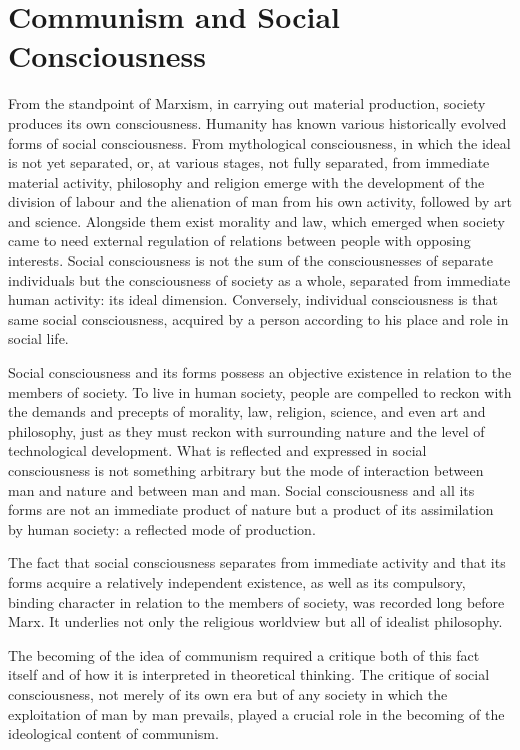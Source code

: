 \documentclass[../main]{subfiles}
\begin{document}
\ifSubfilesClassLoaded{\setcounter{page}{54}}{}
\section{Communism and Social Consciousness}
\label{sec:10_communism_consciousness}

From the standpoint of Marxism, in carrying out material production, society produces its own consciousness. Humanity has known various historically evolved forms of social consciousness. From mythological consciousness, in which the ideal is not yet separated, or, at various stages, not fully separated, from immediate material activity, philosophy and religion emerge with the development of the division of labour and the alienation of man from his own activity, followed by art and science. Alongside them exist morality and law, which emerged when society came to need external regulation of relations between people with opposing interests. Social consciousness is not the sum of the consciousnesses of separate individuals but the consciousness of society as a whole, separated from immediate human activity: its ideal dimension. Conversely, individual consciousness is that same social consciousness, acquired by a person according to his place and role in social life.

Social consciousness and its forms possess an objective existence in relation to the members of society. To live in human society, people are compelled to reckon with the demands and precepts of morality, law, religion, science, and even art and philosophy, just as they must reckon with surrounding nature and the level of technological development. What is reflected and expressed in social consciousness is not something arbitrary but the mode of interaction between man and nature and between man and man. Social consciousness and all its forms are not an immediate product of nature but a product of its assimilation by human society: a reflected mode of production.

The fact that social consciousness separates from immediate activity and that its forms acquire a relatively independent existence, as well as its compulsory, binding character in relation to the members of society, was recorded long before Marx. It underlies not only the religious worldview but all of idealist philosophy.

The becoming of the idea of communism required a critique both of this fact itself and of how it is interpreted in theoretical thinking. The critique of social consciousness, not merely of its own era but of any society in which the exploitation of man by man prevails, played a crucial role in the becoming of the ideological content of communism.
\end{document}

